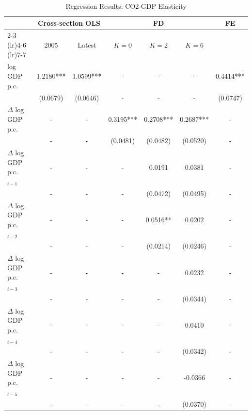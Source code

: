 \documentclass[12pt, a4paper]{article}
\begin{document}
\begin{table}[H]
\centering
\begin{threeparttable}
\caption{Regression Results: CO2-GDP Elasticity}
\label{tab:results}
\begin{tabularx}{\textwidth}{Xcccccc}
\toprule
& \multicolumn{2}{c}{\textbf{Cross-section OLS}} & \multicolumn{3}{c}{\textbf{FD}} & \textbf{FE} \\
\cmidrule(lr){2-3} \cmidrule(lr){4-6} \cmidrule(lr){7-7}
& 2005 & Latest & $K=0$ & $K=2$ & $K=6$ & \\
\midrule
log GDP p.c.                    & 1.2180*** & 1.0599*** & - & - & - & 0.4414*** \\
                                & (0.0679)  & (0.0646)  & - & - & - & (0.0747) \\[0.3em]

$\Delta$ log GDP p.c.           & - & - & 0.3195*** & 0.2708*** & 0.2687*** & - \\
                                & - & - & (0.0481)  & (0.0482)  & (0.0520)  & - \\[0.3em]

$\Delta$ log GDP p.c. $_{t-1}$  & - & - & - & 0.0191 & 0.0381 & -\\
                                & - & - & - & (0.0472) & (0.0495) & -\\[0.3em]

$\Delta$ log GDP p.c. $_{t-2}$  & - & - & - & 0.0516** & 0.0202 & -\\
                                & - & - & - & (0.0214) & (0.0246) & -\\[0.3em]

$\Delta$ log GDP p.c. $_{t-3}$  & - & - & - & - & 0.0232 & -\\
                                & - & - & - & - & (0.0344) & -\\[0.3em]

$\Delta$ log GDP p.c. $_{t-4}$  & - & - & - & - & 0.0410 & -\\
                                & - & - & - & - & (0.0342) & -\\[0.3em]

$\Delta$ log GDP p.c. $_{t-5}$  & - & - & - & - & -0.0366 & -\\
                                & - & - & - & - & (0.0370) & -\\[0.3em] 


\end{tabularx}
\end{threeparttable}
\end{table}
\end{document}
